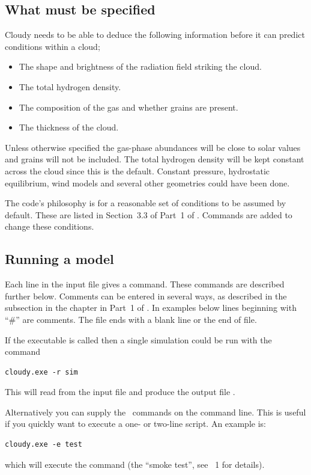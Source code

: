 \documentclass[12pt,twoside]{article}
\begin{document}
{\subsection{What must be specified}

Cloudy needs to be able to deduce the following information before it
can predict conditions within a cloud;

\begin{itemize}
\item The shape and brightness of the radiation field striking the cloud.
\item The total hydrogen density.
\item The composition of the gas and whether grains are present.
\item The thickness of the cloud.
\end{itemize}

Unless otherwise specified the gas-phase abundances will
be close to solar values and grains will not be included.
The total hydrogen density will be kept constant across the cloud
since this is the default.
Constant pressure, hydrostatic equilibrium, wind models
and several other geometries could have been done.

The code's philosophy is for a reasonable set of conditions to be assumed
by default.
These are listed in Section~3.3 of Part~1 of \Hazy.
Commands are added to change these conditions.

\subsection{Running a model}

Each line in the input file gives a command.
These commands are described further below.
Comments can be entered in several ways, as described in
the subsection  in the
chapter  in
Part~1 of \Hazy.
In examples below lines beginning with ``\#'' are comments.
The file ends with a blank line or the end of file.

If the executable is called 
then a single simulation could be run with the command
\small
\begin{verbatim}
cloudy.exe -r sim
\end{verbatim}
\normalsize
This will read from the input file  and 
produce the output file . 

Alternatively you can supply the \Cloudy\ commands on the command line. This
is useful if you quickly want to execute a one- or two-line script. An example is:
\small
\begin{verbatim}
cloudy.exe -e test
\end{verbatim}
\normalsize
which will execute the command  (the ``smoke test'', see \Hazy~1
for details).

}
\end{document}
